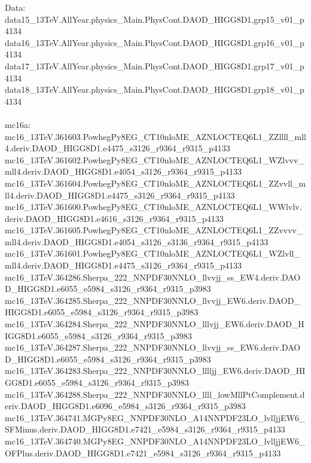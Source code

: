 \begin{footnotesize}
Data: \\
data15\_13TeV.AllYear.physics\_Main.PhysCont.DAOD\_HIGG8D1.grp15\_v01\_p4134 \\
data16\_13TeV.AllYear.physics\_Main.PhysCont.DAOD\_HIGG8D1.grp16\_v01\_p4134 \\
data17\_13TeV.AllYear.physics\_Main.PhysCont.DAOD\_HIGG8D1.grp17\_v01\_p4134 \\
data18\_13TeV.AllYear.physics\_Main.PhysCont.DAOD\_HIGG8D1.grp18\_v01\_p4134 \\
 \\
mc16a: \\
mc16\_13TeV.361603.PowhegPy8EG\_CT10nloME\_AZNLOCTEQ6L1\_ZZllll\_mll4.deriv.DAOD\_HIGG8D1.e4475\_s3126\_r9364\_r9315\_p4133 \\
mc16\_13TeV.361602.PowhegPy8EG\_CT10nloME\_AZNLOCTEQ6L1\_WZlvvv\_mll4.deriv.DAOD\_HIGG8D1.e4054\_s3126\_r9364\_r9315\_p4133 \\
mc16\_13TeV.361604.PowhegPy8EG\_CT10nloME\_AZNLOCTEQ6L1\_ZZvvll\_mll4.deriv.DAOD\_HIGG8D1.e4475\_s3126\_r9364\_r9315\_p4133 \\
mc16\_13TeV.361600.PowhegPy8EG\_CT10nloME\_AZNLOCTEQ6L1\_WWlvlv.deriv.DAOD\_HIGG8D1.e4616\_s3126\_r9364\_r9315\_p4133 \\
mc16\_13TeV.361605.PowhegPy8EG\_CT10nloME\_AZNLOCTEQ6L1\_ZZvvvv\_mll4.deriv.DAOD\_HIGG8D1.e4054\_s3126\_s3136\_r9364\_r9315\_p4133 \\
mc16\_13TeV.361601.PowhegPy8EG\_CT10nloME\_AZNLOCTEQ6L1\_WZlvll\_mll4.deriv.DAOD\_HIGG8D1.e4475\_s3126\_r9364\_r9315\_p4133 \\
mc16\_13TeV.364286.Sherpa\_222\_NNPDF30NNLO\_llvvjj\_ss\_EW4.deriv.DAOD\_HIGG8D1.e6055\_e5984\_s3126\_r9364\_r9315\_p3983
mc16\_13TeV.364285.Sherpa\_222\_NNPDF30NNLO\_llvvjj\_EW6.deriv.DAOD\_HIGG8D1.e6055\_e5984\_s3126\_r9364\_r9315\_p3983
mc16\_13TeV.364284.Sherpa\_222\_NNPDF30NNLO\_lllvjj\_EW6.deriv.DAOD\_HIGG8D1.e6055\_e5984\_s3126\_r9364\_r9315\_p3983
mc16\_13TeV.364287.Sherpa\_222\_NNPDF30NNLO\_llvvjj\_ss\_EW6.deriv.DAOD\_HIGG8D1.e6055\_e5984\_s3126\_r9364\_r9315\_p3983
mc16\_13TeV.364283.Sherpa\_222\_NNPDF30NNLO\_lllljj\_EW6.deriv.DAOD\_HIGG8D1.e6055\_e5984\_s3126\_r9364\_r9315\_p3983
mc16\_13TeV.364288.Sherpa\_222\_NNPDF30NNLO\_llll\_lowMllPtComplement.deriv.DAOD\_HIGG8D1.e6096\_e5984\_s3126\_r9364\_r9315\_p3983
mc16\_13TeV.364741.MGPy8EG\_NNPDF30NLO\_A14NNPDF23LO\_lvlljjEW6\_SFMinus.deriv.DAOD\_HIGG8D1.e7421\_e5984\_s3126\_r9364\_r9315\_p4133 \\
mc16\_13TeV.364740.MGPy8EG\_NNPDF30NLO\_A14NNPDF23LO\_lvlljjEW6\_OFPlus.deriv.DAOD\_HIGG8D1.e7421\_e5984\_s3126\_r9364\_r9315\_p4133 \\

\end{footnotesize}
